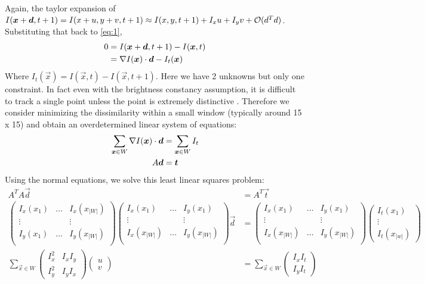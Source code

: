 Again, the taylor expansion of $I(\boldsymbol{x}+\boldsymbol{d}, t+1) = I(x+u, y+v, t+1) \approx I(x,y,t+1) + I_xu +
I_yv + \mathcal{O}(d^Td)$. Substituting that back to \eqref{eq:1},
\begin{align*}
0 &=I(\boldsymbol{x} + \boldsymbol{d}, t+1) - I(\boldsymbol{x}, t)\\
&= \nabla I(\boldsymbol{x})\cdot \boldsymbol{d} - I_t(\boldsymbol{x})
\end{align*}
Where $I_t(\vec x) =I(\vec x, t) - I(\vec x, t+1)$. Here we have 2
unknowns but only one constraint. In fact even with the brightness
constancy assumption, it is difficult to track a single point unless
the point is extremely distinctive \cite{KLT}. Therefore we consider minimizing
the dissimilarity within a small window (typically around 15 x 15) and
obtain an overdetermined linear system of equations:
\begin{align*}
\sum_{\boldsymbol{x}\in W} \nabla I(\boldsymbol{x}) \cdot \boldsymbol{d} &= \sum_{\boldsymbol{x}\in W}
I_t \\
A\boldsymbol{d} &= \boldsymbol{t}
\end{align*}
Using the normal equations, we solve this least linear squares
problem:
\begin{align*}\label{eq:klt}
  A^TA\vec d &= A^T \vec t\\
  \begin{pmatrix}
    I_x(x_1) & \hdots & I_x(x_{|W|}) \\
   \vdots &  & \vdots \\
  I_y(x_1) & \hdots & I_y(x_{|W|}) \\
  \end{pmatrix}
  \begin{pmatrix}
    I_x(x_1) & \hdots &   I_y(x_1)  \\
   \vdots &  & \vdots \\
I_x(x_{|W|})& \hdots & I_y(x_{|W|}) \\
  \end{pmatrix}
\vec d  &= 
  \begin{pmatrix}
    I_x(x_1) & \hdots &   I_y(x_1)  \\
   \vdots &  & \vdots \\
I_x(x_{|W|})& \hdots & I_y(x_{|W|}) \\
  \end{pmatrix}
  \begin{pmatrix}
    I_t(x_1)\\ \vdots \\ I_t(x_{|w|})
  \end{pmatrix}\\
\sum_{\vec x\in W}
\begin{pmatrix}
   I_x^2 & I_xI_y\\I_y^2 & I_yI_x
\end{pmatrix}
\begin{pmatrix}
  u \\ v
\end{pmatrix}
 &=\sum_{\vec x\in W}
\begin{pmatrix}
  I_xI_t\\I_yI_t
\end{pmatrix}
\end{align*}

